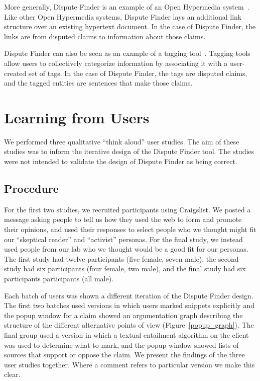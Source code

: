 \documentclass{www2010-submission}
\begin{document}
More generally, Dispute Finder is an example of an Open Hypermedia system~\cite{Bouvin2000,Wiil1996}. Like other Open Hypermedia systems, Dispute Finder lays an additional link structure over an existing hypertext document. In the case of Dispute Finder, the links are from disputed claims to information about those claims.

Dispute Finder can also be seen as an example of a tagging tool~\cite{Marlow2006,Golder2006}. Tagging tools allow users to collectively categorize information by associating it with a user-created set of tags. In the case of Dispute Finder, the tags are disputed claims, and the tagged entities are sentences that make those claims.




\section{Learning from Users}

We performed three qualitative ``think aloud'' user studies. The aim of these studies was to inform the iterative design of the Dispute Finder tool. The studies were not intended to validate the design of Dispute Finder as being correct. 

\subsection{Procedure}

For the first two studies, we recruited participants using Craigslist. We posted a message asking people to tell us how they used the web to form and promote their opinions, and used their responses to select people who we thought might fit our ``skeptical reader'' and ``activist'' personas. For the final study, we instead used people from our lab who we thought would be a good fit for our personas. The first study had twelve participants (five female, seven male), the second study had six participants (four female, two male), and the final study had six participants participants (all male). 

Each batch of users was shown a different iteration of the Dispute Finder design. The first two batches used versions in which users marked snippets explicitly and the popup window for a claim showed an argumentation graph describing the structure of the different alternative points of view (Figure~\ref{popup_graph}). The final group used a version in which a textual entailment algorithm on the client was used to determine what to mark, and the popup window showed lists of sources that support or oppose the claim. We present the findings of the three user studies together. Where a comment refers to particular version we make this clear.
\end{document}
